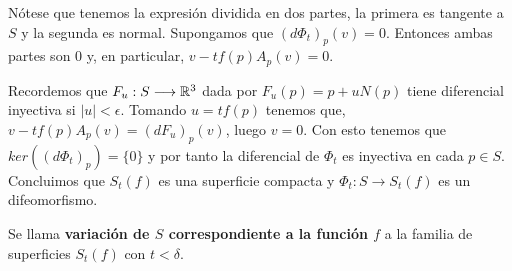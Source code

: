 Nótese que tenemos la expresión dividida en dos partes, la primera es tangente a $S$ y la segunda es normal. Supongamos que $(d\Phi_t)_p(v) = 0$. Entonces ambas partes son $0$ y, en particular, $v - tf(p)A_p(v) = 0$.

Recordemos que $F_u: S \longrightarrow \mathbb{R}^3$ dada por $F_u(p) = p + uN(p)$ tiene diferencial inyectiva si $|u| < \epsilon$. Tomando $u=tf(p)$ tenemos que, $v - tf(p)A_p(v) = (dF_u)_p(v)$, luego $v=0$. Con esto tenemos que $ker((d\Phi_t)_p) = \{0\}$ y por tanto la diferencial de $\Phi_t$ es inyectiva en cada $p\in S$. Concluimos que $S_t(f)$ es una superficie compacta y $\Phi_t: S \longrightarrow S_t(f)$ es un difeomorfismo.

\begin{definition}[Variación]
Se llama \textbf{variación de $S$ correspondiente a la función $f$} a la familia de superficies $S_t(f)$ con $t < \delta$.
\end{definition}


